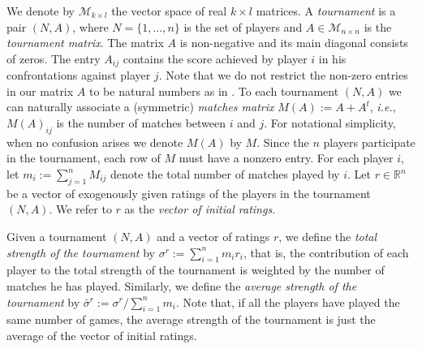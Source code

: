 \documentclass[a4paper,10pt]{article}
\theoremstyle{remark}
\newcommand{\TM}{A} %
\newcommand{\MM}{M} %
\newcommand{\TS}{\sigma^\rv} %
\newcommand{\AS}{\bar \sigma^\rv} %
\newcommand{\MS}{\mathcal M} %
\newcommand{\rv}{r} %
\begin{document}
We denote by $\MS_{k\times l}$ the vector space of real $k\times
l$ matrices. A \emph{tournament} is a pair $(N,\TM)$, where
$N=\{1,\ldots, n\}$ is the set of players and $\TM\in \MS_{n\times
n}$ is the \emph{tournament matrix}. The matrix $\TM$ is
non-negative and its main diagonal consists of zeros. The entry
$\TM_{ij}$ contains the score achieved by player $i$ in his
confrontations against player $j$. Note that we do not restrict
the non-zero entries in our matrix $\TM$ to be natural numbers as
in \cite{Volij:2005}. To each tournament $(N,\TM)$ we can
naturally associate a (symmetric) \emph{matches matrix} $\MM(\TM):=\TM+\TM^t$, \emph{i.e.}, $\MM(\TM)_{ij}$ is
the number of matches between $i$ and $j$. For notational
simplicity, when no confusion arises we denote $\MM(\TM)$ by
$\MM$. Since the $n$ players participate in the tournament, each
row of $\MM$ must have a nonzero entry. For each player $i$, let
$m_i:=\sum_{j=1}^n \MM_{ij}$ denote the total number of matches
played by $i$. Let $\rv\in \mathbb R^n$ be a vector of exogenously
given ratings of the players in the tournament $(N,\TM)$. We refer
to $\rv$ as the \emph{vector of initial ratings}.


Given a tournament $(N,\TM)$ and a vector of ratings $\rv$, we
define the \emph{total strength of the tournament} by
$\TS:=\sum_{i=1}^n m_i \rv_i $, that is, the contribution of each
player to the total strength of the tournament is weighted by the
number of matches he has played. Similarly, we define the
\emph{average strength of the tournament} by
$\AS:=\TS/\sum_{i=1}^n m_i$. Note that, if all the players have
played the same number of games, the average strength of the
tournament is just the average of the vector of initial ratings.
\end{document}
